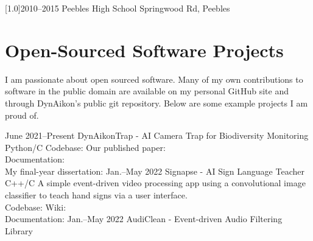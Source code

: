 \documentclass[]{cv-style}     %
\begin{document}
\begin{minipage}[b]{1.4\textwidth}
\begin{entrylist}
\entry
{\scalebox{.8}[1.0]{2010--2015}}
{Peebles High School}
{Springwood Rd, Peebles}

\end{entrylist}
\end{minipage}

\hspace*{-5.5cm}\begin{minipage}[b]{1.4\textwidth}
\vspace{-0.4cm}
\section{Open-Sourced Software Projects}
  \vspace{0.1cm}
I am passionate about open sourced software. Many of my own contributions to software in the public domain are available on my personal GitHub site and through DynAikon's public git repository. Below are some example projects I am proud of.
\vspace{0.1cm}
\begin{entrylist}
\entry
{June 2021--Present}
{DynAikonTrap - AI Camera Trap for Biodiversity Monitoring}
{Python/C}
{
Codebase:  Our published paper: \\
Documentation:  \\My final-year dissertation: 
}
\vspace{0.1cm}
\entry
{Jan.--May 2022}
{Signapse - AI Sign Language Teacher}
{C++/C}
{
A simple event-driven video processing app using a convolutional image classifier to teach hand signs via a user interface. \\
Codebase:  Wiki:  \\
Documentation: 
}
\vspace{0.1cm}
\entry
{Jan.--May 2022}
{AudiClean - Event-driven Audio Filtering Library}

\end{entrylist}
\end{minipage}
\end{document}
